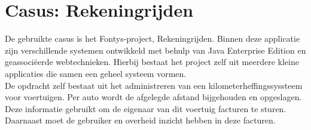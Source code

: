 \chapter{Casus: Rekeningrijden}

De gebruikte casus is het Fontys-project, Rekeningrijden. Binnen deze applicatie zijn verschillende systemen ontwikkeld met behulp van Java Enterprise Edition en geassoci\"eerde webtechnieken. Hierbij bestaat het project zelf uit meerdere kleine applicaties die samen een geheel systeem vormen. \\

De opdracht zelf bestaat uit het administreren van een kilometerheffingssyssteem voor voertuigen. Per auto wordt de afgelegde afstand bijgehouden en opgeslagen. Deze informatie gebruikt om de eigenaar van dit voertuig facturen te sturen. Daarnaast moet de gebruiker en overheid inzicht hebben in deze facturen.